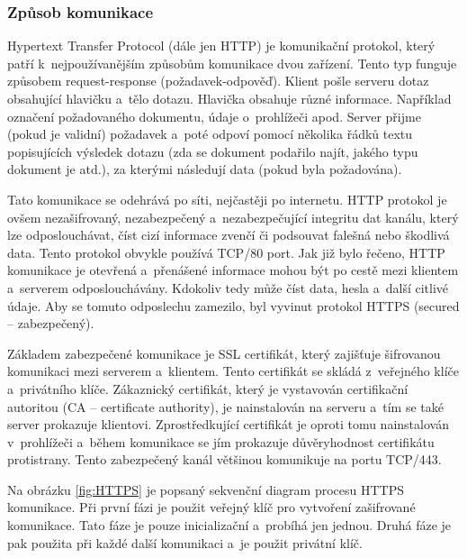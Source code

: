 \subsubsection{Způsob komunikace}
\label{sec:zpusobKomunikace}


Hypertext Transfer Protocol (dále jen HTTP) je komunikační protokol, který patří k~nejpoužívanějším způsobům komunikace dvou zařízení. Tento typ funguje způsobem request-response (požadavek-odpověď). Klient pošle serveru dotaz obsahující hlavičku a~tělo dotazu. Hlavička obsahuje různé informace. Například označení požadovaného dokumentu, údaje o~prohlížeči apod. Server přijme (pokud je validní) požadavek a~poté odpoví pomocí několika řádků textu popisujících výsledek dotazu (zda se dokument podařilo najít, jakého typu dokument je atd.), za kterými následují data (pokud byla požadována).
 
Tato komunikace se odehrává po síti, nejčastěji po internetu. HTTP protokol je ovšem nezašifrovaný, nezabezpečený a~nezabezpečující integritu dat kanálu, který lze odposlouchávat, číst cizí informace zvenčí či podsouvat falešná nebo škodlivá data. Tento protokol obvykle používá TCP/80 port. Jak již bylo řečeno, HTTP komunikace je otevřená a~přenášené informace mohou být po cestě mezi klientem a~serverem odposlouchávány. Kdokoliv tedy může číst data, hesla a~další citlivé údaje. Aby se tomuto odposlechu zamezilo, byl vyvinut protokol HTTPS (secured – zabezpečený).\cite{4}
 
Základem zabezpečené komunikace je SSL certifikát, který zajišťuje šifrovanou komunikaci mezi serverem a~klientem. Tento certifikát se skládá z~veřejného klíče a~privátního klíče. Zákaznický certifikát, který je vystavován certifikační autoritou (CA -- certificate authority), je nainstalován na serveru a~tím se také server prokazuje klientovi. Zprostředkující certifikát je oproti tomu nainstalován v~prohlížeči a~během komunikace se jím prokazuje důvěryhodnost certifikátu protistrany. Tento zabezpečený kanál většinou komunikuje na portu TCP/443.\cite{5}

Na obrázku \ref{fig:HTTPS} je popsaný sekvenční diagram procesu HTTPS komunikace. Při první fázi je použit veřejný klíč pro vytvoření zašifrované komunikace. Tato fáze je pouze inicializační a~probíhá jen jednou. Druhá fáze je pak použita při každé další komunikaci a~je použit privátní klíč. 

